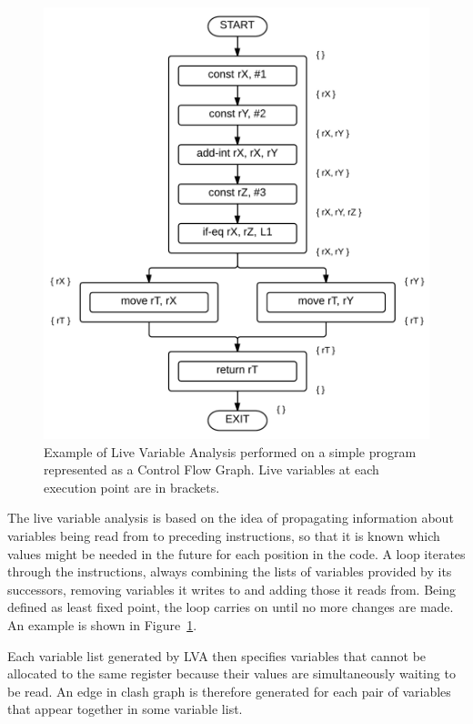 \documentclass[12pt,twoside,notitlepage]{report}
\begin{document}
\begin{figure}
	\centerline{	
		\includegraphics[height=0.42\textheight]{figs/fig_implementation_lva.png}
	}
	\caption{Example of Live Variable Analysis performed on a simple program represented as a Control Flow Graph. Live variables at each execution point are in brackets.}
	\label{fig:Implementation_LVA}
\end{figure}

The live variable analysis is based on the idea of propagating information about variables being read from to preceding instructions, so that it is known which values might be needed in the future for each position in the code. A loop iterates through the instructions, always combining the lists of variables provided by its successors, removing variables it writes to and adding those it reads from. Being defined as least fixed point, the loop carries on until no more changes are made. An example is shown in Figure~\ref{fig:Implementation_LVA}.

Each variable list generated by LVA then specifies variables that cannot be allocated to the same register because their values are simultaneously waiting to be read. An edge in clash graph is therefore generated for each pair of variables that appear together in some variable list.
\end{document}
